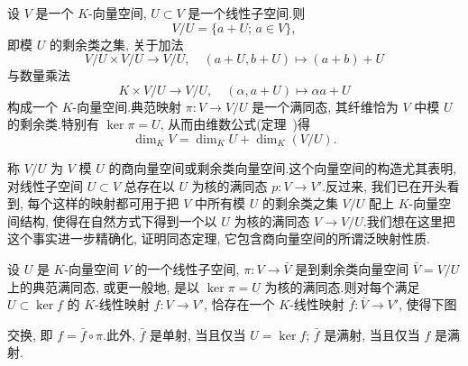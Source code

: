 \begin{theorem}[商向量空间]\label{thm:2.2.7}
设 $V$ 是一个 $K$-向量空间, $U \subset V$ 是一个线性子空间.则
\[
V/U = \{a + U;\, a \in V\},
\]
即模 $U$ 的剩余类之集, 关于加法
\[
V/U \times V/U \longrightarrow V/U, \quad (a + U, b + U) \longmapsto (a + b) + U
\]
与数量乘法
\[
K \times V/U \longrightarrow V/U, \quad (\alpha, a + U) \longmapsto \alpha a + U
\]
构成一个 $K$-向量空间.典范映射 $\pi \colon V \longrightarrow V/U$ 是一个满同态, 其纤维恰为 $V$ 中模 $U$ 的剩余类.特别有 $\ker \pi = U$, 从而由维数公式(定理~)得
\[
\dim_K V = \dim_K U + \dim_K(V/U)\text{.}
\]
\end{theorem}

称 $V/U$ 为 $V$ 模 $U$ 的商向量空间或剩余类向量空间.这个向量空间的构造尤其表明, 对线性子空间 $U \subset V$ 总存在以 $U$ 为核的满同态 $p \colon V \longrightarrow V'$.反过来, 我们已在开头看到, 每个这样的映射都可用于把 $V$ 中所有模 $U$ 的剩余类之集 $V/U$ 配上 $K$-向量空间结构, 使得在自然方式下得到一个以 $U$ 为核的满同态 $V \longrightarrow V/U$.我们想在这里把这个事实进一步精确化, 证明同态定理, 它包含商向量空间的所谓泛映射性质.

\begin{theorem}[同态定理]\label{thm:2.2.8}
设 $U$ 是 $K$-向量空间 $V$ 的一个线性子空间, $\pi \colon V \longrightarrow \bar{V}$ 是到剩余类向量空间 $\bar{V} = V/U$ 上的典范满同态, 或更一般地, 是以 $\ker \pi = U$ 为核的满同态.则对每个满足 $U \subset \ker f$ 的 $K$-线性映射 $f \colon V \longrightarrow V'$, 恰存在一个 $K$-线性映射 $\bar{f} \colon \bar{V} \longrightarrow V'$, 使得下图
\begin{center}
\end{center}
交换, 即 $f = \bar{f} \circ \pi$.此外, $\bar{f}$ 是单射, 当且仅当 $U = \ker f$; $\bar{f}$ 是满射, 当且仅当 $f$ 是满射.
\end{theorem}


